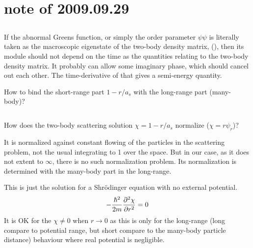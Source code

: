 \section{note of 2009.09.29}
\subsection{}
If the abnormal Greens function, or simply the order parameter $\psi\psi$ is literally taken as the macroscopic eigenstate of the two-body density matrix, (\cite{Leggett}), then its module should not depend on the time as the quantities relating to the two-body density matrix.  It probably can allow some imaginary phase, which should cancel out each other.   The time-derivative of that gives a semi-energy quantity.  

How to bind the short-range part $1-r/a_s$ with the long-range part (many-body)?

\subsection{}
How does the two-body scattering solution $\chi=1-r/a_s$ normalize ($\chi=r\psi_r$)? 

It is normalized against constant flowing of the particles in the scattering problem, not the usual integrating to 1 over the space.  But in our case, as it does not extent to $\infty$, there is no such normalization problem.  Its normalization is determined with the many-body part in the long-range. 

This is just the solution for a Shr\"{o}‌dinger equation with no external potential.  
\[-\frac{\hbar^2}{2m}\frac{\partial^2{\chi}}{\partial{{r}^2}}=0\]
It is OK for the $\chi\neq0$ when $r\rightarrow0$ as this is only for the long-range (long compare to potential range, but short compare to the many-body particle distance) behaviour where real potential is negligible.  

